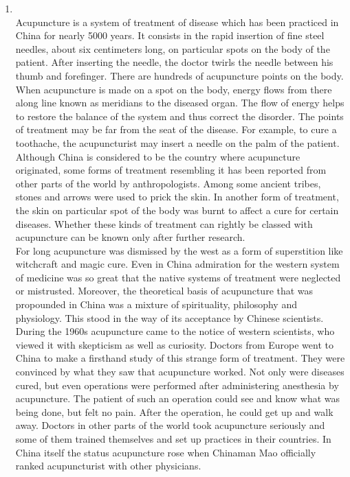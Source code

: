 \documentclass[12pt]{article}
\begin{document}
\begin{enumerate}
      If COVID-19 is spreading in your community, stay safe by taking some simple precautions, such as physical distancing, wearing a mask, keeping rooms well ventilated, avoiding crowds, cleaning your hands and coughing into a bent elbow or tissue.

    \item {}\\
      Acupuncture is a system of treatment of disease which has been practiced in China for nearly 5000 years. It consists in the rapid insertion of fine steel needles, about six centimeters long, on particular spots on the body of the patient. After inserting the needle, the doctor twirls the needle between his thumb and forefinger. There are hundreds of acupuncture points on the body. When acupuncture is made on a spot on the body, energy flows from there along line known as meridians to the diseased organ. The flow of energy helps to restore the balance of the system and thus correct the disorder. The points of treatment may be far from the seat of the disease. For example, to cure a toothache, the acupuncturist may insert a needle on the palm of the patient.\\
      
      Although China is considered to be the country where acupuncture originated, some forms of treatment resembling it has been reported from other parts of the world by anthropologists. Among some ancient tribes, stones and arrows were used to prick the skin. In another form of treatment, the skin on particular spot of the body was burnt to affect a cure for certain diseases. Whether these kinds of treatment can rightly be classed with acupuncture can be known only after further research.\\

      For long acupuncture was dismissed by the west as a form of superstition like witchcraft and magic cure. Even in China admiration for the western system of medicine was so great that the native systems of treatment were neglected or mistrusted. Moreover, the theoretical basis of acupuncture that was propounded in China was a mixture of spirituality, philosophy and physiology. This stood in the way of its acceptance by Chinese scientists.\\

      During the 1960s acupuncture came to the notice of western scientists, who viewed it with skepticism as well as curiosity. Doctors from Europe went to China to make a firsthand study of this strange form of treatment. They were convinced by what they saw that acupuncture worked. Not only were diseases cured, but even operations were performed after administering anesthesia by acupuncture. The patient of such an operation could see and know what was being done, but felt no pain. After the operation, he could get up and walk away. Doctors in other parts of the world took acupuncture seriously and some of them trained themselves and set up practices in their countries. In China itself the status acupuncture rose when Chinaman Mao officially ranked acupuncturist with other physicians.


\end{enumerate}
\end{document}
